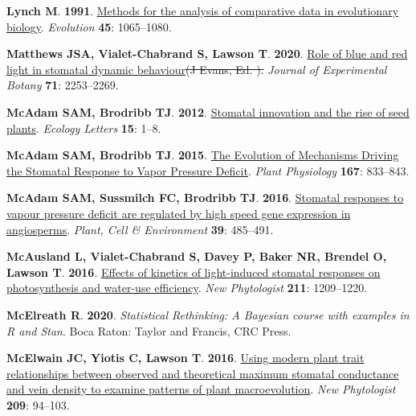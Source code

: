 \documentclass[
  letterpaper,
  DIV=11,
  numbers=noendperiod]{scrartcl}
\newlength{\cslhangindent}
\newenvironment{CSLReferences}[2] %
 {\begin{list}{}{%
  \setlength{\itemindent}{0pt}
  \setlength{\leftmargin}{0pt}
  \setlength{\parsep}{0pt}
  \ifodd #1
   \setlength{\leftmargin}{\cslhangindent}
   \setlength{\itemindent}{-1\cslhangindent}
  \fi
  \setlength{\itemsep}{#2\baselineskip}}}
 {\end{list}}
\providecommand{\DIFaddtex}[1]{{\protect\color{blue}\uwave{#1}}} %
\providecommand{\DIFdeltex}[1]{{\protect\color{red}\sout{#1}}}                      %
\providecommand{\DIFaddbegin}{} %
\providecommand{\DIFaddend}{} %
\providecommand{\DIFdelbegin}{} %
\providecommand{\DIFdelend}{} %
\providecommand{\DIFadd}[1]{\texorpdfstring{\DIFaddtex{#1}}{#1}} %
\providecommand{\DIFdel}[1]{\texorpdfstring{\DIFdeltex{#1}}{}} %
\newcommand{\DIFscaledelfig}{0.5}
\newlength{\DIFdelgraphicswidth} %
\newlength{\DIFdelgraphicsheight} %
\newcommand{\DIFaddincludegraphics}[2][]{{\color{blue}\fbox{\DIFOincludegraphics[#1]{#2}}}} %
\newcommand{\DIFdelincludegraphics}[2][]{%
\sbox{\DIFdelgraphicsbox}{\DIFOincludegraphics[#1]{#2}}%
\settoboxwidth{\DIFdelgraphicswidth}{\DIFdelgraphicsbox} %
\settoboxtotalheight{\DIFdelgraphicsheight}{\DIFdelgraphicsbox} %
\scalebox{\DIFscaledelfig}{%
\parbox[b]{\DIFdelgraphicswidth}{\usebox{\DIFdelgraphicsbox}\\[-\baselineskip] \rule{\DIFdelgraphicswidth}{0em}}\llap{\resizebox{\DIFdelgraphicswidth}{\DIFdelgraphicsheight}{%
\setlength{\unitlength}{\DIFdelgraphicswidth}%
\begin{picture}(1,1)%
\thicklines\linethickness{2pt} %
{\color[rgb]{1,0,0}\put(0,0){\framebox(1,1){}}}%
{\color[rgb]{1,0,0}\put(0,0){\line( 1,1){1}}}%
{\color[rgb]{1,0,0}\put(0,1){\line(1,-1){1}}}%
\end{picture}%
}\hspace*{3pt}}} %
} %
\DeclareRobustCommand{\DIFaddbegin}{\DIFOaddbegin \let\includegraphics\DIFaddincludegraphics} %
\DeclareRobustCommand{\DIFaddend}{\DIFOaddend \let\includegraphics\DIFOincludegraphics} %
\DeclareRobustCommand{\DIFdelbegin}{\DIFOdelbegin \let\includegraphics\DIFdelincludegraphics} %
\DeclareRobustCommand{\DIFdelend}{\DIFOaddend \let\includegraphics\DIFOincludegraphics} %
\begin{document}
\begin{CSLReferences}{0}{1}
\textbf{\textbf{Lynch M}}. \textbf{1991}.
\href{https://doi.org/10.1111/j.1558-5646.1991.tb04375.x}{Methods for
the analysis of comparative data in evolutionary biology}.
\emph{Evolution} \textbf{45}: 1065--1080.

\textbf{\textbf{Matthews JSA}, \textbf{Vialet-Chabrand S},
\textbf{Lawson T}}. \textbf{2020}.
\href{https://doi.org/10.1093/jxb/erz563}{Role of blue and red light in
stomatal dynamic behaviour}\DIFdelbegin \DIFdel{(J Evans, Ed. ). }\DIFdelend \DIFaddbegin \DIFadd{. }\DIFaddend \emph{Journal of Experimental Botany}
\textbf{71}: 2253--2269.

\textbf{\textbf{McAdam SAM}, \textbf{Brodribb TJ}}. \textbf{2012}.
\href{https://doi.org/10.1111/j.1461-0248.2011.01700.x}{Stomatal
innovation and the rise of seed plants}. \emph{Ecology Letters}
\textbf{15}: 1--8.

\textbf{\textbf{McAdam SAM}, \textbf{Brodribb TJ}}. \textbf{2015}.
\href{https://doi.org/10.1104/pp.114.252940}{The {Evolution} of
{Mechanisms Driving} the {Stomatal Response} to {Vapor Pressure
Deficit}}. \emph{Plant Physiology} \textbf{167}: 833--843.

\textbf{\textbf{McAdam SAM}, \textbf{Sussmilch FC}, \textbf{Brodribb
TJ}}. \textbf{2016}. \href{https://doi.org/10.1111/pce.12633}{Stomatal
responses to vapour pressure deficit are regulated by high speed gene
expression in angiosperms}. \emph{Plant, Cell \& Environment}
\textbf{39}: 485--491.

\textbf{\textbf{McAusland L}, \textbf{Vialet-Chabrand S}, \textbf{Davey
P}, \textbf{Baker NR}, \textbf{Brendel O}, \textbf{Lawson T}}.
\textbf{2016}. \href{https://doi.org/10.1111/nph.14000}{Effects of
kinetics of light-induced stomatal responses on photosynthesis and
water-use efficiency}. \emph{New Phytologist} \textbf{211}: 1209--1220.

\textbf{\textbf{McElreath R}}. \textbf{2020}. \emph{Statistical
{Rethinking}: A {Bayesian} course with examples in {R} and {Stan}}. Boca
Raton: {Taylor and Francis, CRC Press}.

\textbf{\textbf{McElwain JC}, \textbf{Yiotis C}, \textbf{Lawson T}}.
\textbf{2016}. \href{https://doi.org/10.1111/nph.13579}{Using modern
plant trait relationships between observed and theoretical maximum
stomatal conductance and vein density to examine patterns of plant
macroevolution}. \emph{New Phytologist} \textbf{209}: 94--103.


\end{CSLReferences}
\end{document}
